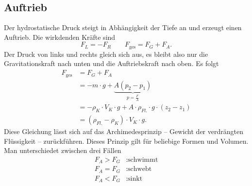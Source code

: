 \documentclass[a4paper,12pt]{article}
\numberwithin{equation}{section}
\begin{document}
\subsection{Auftrieb}
Der hydrostatische Druck steigt in Abhängigkeit der Tiefe an und erzeugt einen Auftrieb. Die wirkdenden Kräfte sind
\[ 
        F_L=-F_R\qquad F_{\text{ges}}=F_G+F_A
.\] 
Der Druck von links und rechts gleich sich aus, es bleibt also nur die Gravitationskraft nach unten und die Auftriebskraft nach oben. Es folgt
\begin{align*}
        F_{\text{ges}}&=F_G+F_A\\
                      &=-m\cdot g+\underbrace{A\left(p_2-p_1\right)}_{p=\tfrac{F}{A}}\\
                      &=-\rho _K\cdot V_K\cdot g+A\cdot \rho _{Fl.}\cdot g\cdot \left(z_2-z_1\right)\\
                      &=\left(\rho _{Fl.}-\rho _K\right)\cdot V_K\cdot g
.\end{align*}
Diese Gleichung lässt sich auf das Archimedesprinzip -- Gewicht der verdrängten Flüssigkeit -- zurückführen. Dieses Prinzip gilt für beliebige Formen und Volumen. Man unterschiedet zwischen drei Fällen
\begin{align*}
        F_A>F_G&:\text{schwimmt}\\
        F_A=F_G&:\text{schwebt}\\
        F_A<F_G&:\text{sinkt}
\end{align*}
\end{document}
